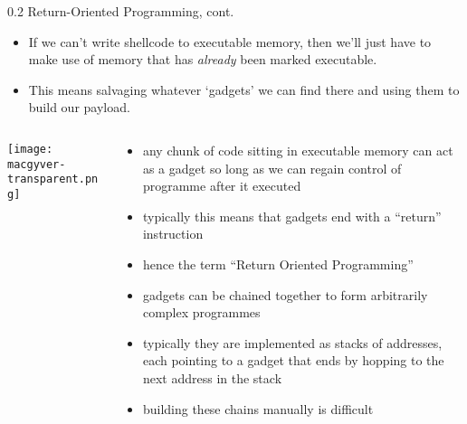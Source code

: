 \documentclass[9pt]{beamer}
\begin{document}
\begin{frame}{0.2 Return-Oriented Programming, cont.}

\begin{itemize}
\item If we can't write shellcode to executable memory, then we'll just have to make use of memory that has \emph{already} been marked executable.
\item This means salvaging whatever `gadgets' we can find there and using them to build our payload.
\end{itemize}
 

\begin{columns}

\begin{column}{0.3\textwidth}
\texttt{[image: macgyver-transparent.png]}
\end{column}


\begin{column}{0.7\textwidth}
\small

\begin{itemize}

\item any chunk of code sitting in executable memory can act as a gadget so long as we can regain control of programme after it executed

\item typically this means that gadgets end with a ``return'' instruction

\item hence the term ``Return Oriented Programming''

\item gadgets can be chained together to form arbitrarily complex programmes

\item typically they are implemented as stacks of addresses, each pointing to a gadget that ends by hopping to the next address in the stack

\item building these chains manually is difficult


\end{itemize}
\end{column}
\end{columns}
\end{frame}
\end{document}
